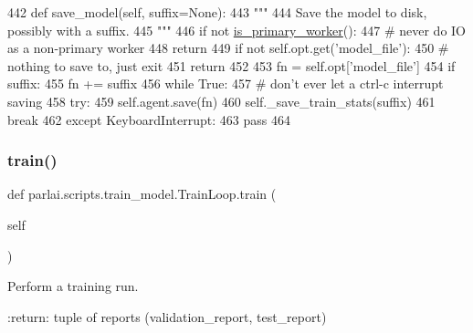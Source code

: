 \begin{DoxyCode}
442     \textcolor{keyword}{def }save\_model(self, suffix=None):
443         \textcolor{stringliteral}{"""}
444 \textcolor{stringliteral}{        Save the model to disk, possibly with a suffix.}
445 \textcolor{stringliteral}{        """}
446         \textcolor{keywordflow}{if} \textcolor{keywordflow}{not} \hyperlink{namespaceparlai_1_1utils_1_1distributed_a9bb1dac198180590ef8c6b6c6f9fc2c4}{is\_primary\_worker}():
447             \textcolor{comment}{# never do IO as a non-primary worker}
448             \textcolor{keywordflow}{return}
449         \textcolor{keywordflow}{if} \textcolor{keywordflow}{not} self.opt.get(\textcolor{stringliteral}{'model\_file'}):
450             \textcolor{comment}{# nothing to save to, just exit}
451             \textcolor{keywordflow}{return}
452 
453         fn = self.opt[\textcolor{stringliteral}{'model\_file'}]
454         \textcolor{keywordflow}{if} suffix:
455             fn += suffix
456         \textcolor{keywordflow}{while} \textcolor{keyword}{True}:
457             \textcolor{comment}{# don't ever let a ctrl-c interrupt saving}
458             \textcolor{keywordflow}{try}:
459                 self.agent.save(fn)
460                 self.\_save\_train\_stats(suffix)
461                 \textcolor{keywordflow}{break}
462             \textcolor{keywordflow}{except} KeyboardInterrupt:
463                 \textcolor{keywordflow}{pass}
464 
\end{DoxyCode}
\mbox{\label{classparlai_1_1scripts_1_1train__model_1_1TrainLoop_a8c15c0d4490891fd3e61e57501474e40}} 
\subsubsection{\texorpdfstring{train()}{train()}}
{\footnotesize\ttfamily def parlai.\+scripts.\+train\+\_\+model.\+Train\+Loop.\+train (\begin{DoxyParamCaption}\item[{}]{self }\end{DoxyParamCaption})}

\begin{DoxyVerb}Perform a training run.

:return: tuple of reports (validation_report, test_report)
\end{DoxyVerb}
 

